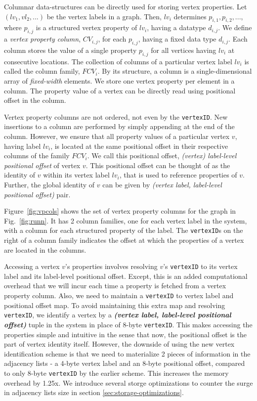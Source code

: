 Columnar data-structures can be directly used for storing vertex properties. Let $(lv_1, vl_2, ...)$ be the vertex labels in a graph. Then, $lv_i$ determines $p_{i,1},  p_{i,2}, ...$, where $p_{i, j}$ is a structured vertex property of $lv_i$, having a datatype $d_{i,j}$. We define a \emph{vertex property column}, $CV_{i,j}$, for each $p_{i,j}$, having a fixed data type $d_{i,j}$. Each column stores the value of a single property $p_{i,j}$ for all vertices having $lv_i$ at consecutive locations. The collection of columns of a particular vertex label $lv_i$ is called the column family, $FCV_i$. By its structure, a column is a single-dimensional array of \emph{fixed-width} elements. We store one vertex property per element in a column. The property value of a vertex can be directly read using positional offset in the column.

Vertex property columns are not ordered, not even by the \texttt{vertexID}. New insertions to a column are performed by simply appending at the end of the column. However, we ensure that all property values of a particular vertex $v$, having label $lv_i$, is located at the same positional offset in their respective columns of the family $FCV_i$. We call this positional offset, \emph{(vertex) label-level positional offset} of vertex $v$. This positional offset can be thought of as the identity of $v$ within its vertex label $lv_i$, that is used to reference properties of $v$. Further, the global identity of $v$ can be given by \textit{(vertex label, label-level positional offset)} pair. 

Figure~\ref{fig:vpcols} shows the set of vertex property columns for the graph in Fig.~\ref{fig:runn}. It has 2 column families, one for each vertex label in the system, with a column for each structured property of the label. The \texttt{vertexID}s on the right of a column family indicates the offset at which the properties of a vertex are located in the columns.

Accessing a vertex $v$'s properties involves resolving $v$'s \texttt{vertexID} to its vertex label and its label-level positional offset. Except, this is an added computational overhead that we will incur each time a property is fetched from a vertex property column. Also, we need to maintain a \texttt{vertexID} to vertex label and positional offset map. To avoid maintaining this extra map and resolving \texttt{vertexID}, we identify a vertex by a \emph{\textbf{(vertex label, label-level positional offset)}} tuple in the system in place of 8-byte \texttt{vertexID}. This makes accessing the properties simple and intuitive in the sense that now, the positional offset is the part of vertex identity itself. However, the downside of using the new vertex identification scheme is that we need to materialize 2 pieces of information in the adjacency lists - a 4-byte vertex label and an 8-byte positional offset, compared to only 8-byte \texttt{vertexID} by the earlier scheme. This increases the memory overhead by 1.25x. We introduce several storge optimizations to counter the surge in adjacency lists size in section \ref{sec:storage-optimizations}.

